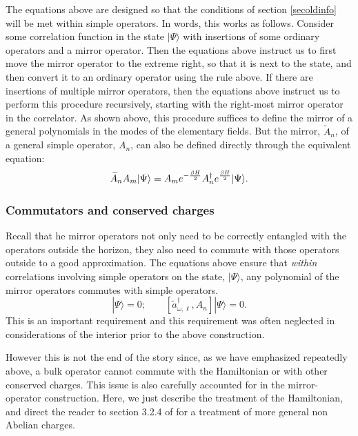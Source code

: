 \documentclass[12pt]{article}
\newcommand{\cop}[1]{#1}
\newcommand{\al}{\cop{A}} %
\def\ta{\widetilde{\cop{a}}}
\newcommand{\be}{\begin{equation}}
\newcommand{\ee}{\end{equation}}
\begin{document}
The equations above are designed so that the conditions of section \ref{secoldinfo} will be met within simple operators. In words, this works as follows. Consider some correlation function in the state $|\Psi \rangle$
with insertions of some ordinary operators and a mirror operator.  Then the equations above instruct us to first move the mirror operator to the extreme right, so that it is next to the state, and then convert it to an ordinary operator using the rule above. If there are insertions of multiple mirror operators, then the equations above instruct us to perform this procedure recursively, starting with the right-most mirror operator in the correlator. As shown above, this procedure suffices to define the mirror of a general polynomials in the modes of the elementary fields. But the mirror, $\widetilde{A}_n$, of a general simple operator, $A_n$, can also be defined directly through the equivalent equation:
\be
\label{generalmirror}
\widetilde{\al}_n \al_m |\Psi \rangle = \al_m e^{-{\beta H \over 2}} \al_n^{\dagger} e^{\beta H \over 2} |\Psi \rangle.
\ee

\subsubsection*{Commutators and conserved charges }
Recall that he mirror operators not only need to be correctly entangled with the operators outside the horizon, they also need to  commute with those operators outside to a good approximation.  The equations above ensure that {\em within} correlations involving simple operators on the state, $|\Psi \rangle$,  any polynomial of the mirror operators commutes with simple operators.
\be
[\ta_{\omega, \ell}, \al_m] |\Psi \rangle = 0;  \qquad  [\ta_{\omega, \ell}^{\dagger}, \al_n] |\Psi \rangle = 0.
\ee
This is an important requirement and this requirement was often neglected in considerations of the interior prior to the above construction.


However this is not the end of the story since, as we have emphasized repeatedly above, a bulk operator cannot commute with the Hamiltonian or with other conserved charges. This issue is also carefully accounted for in the mirror-operator construction. Here, we just describe the treatment of the Hamiltonian, and direct the reader to section  3.2.4 of \cite{Papadodimas:2013jku} for a treatment of more general non Abelian charges.
\end{document}
